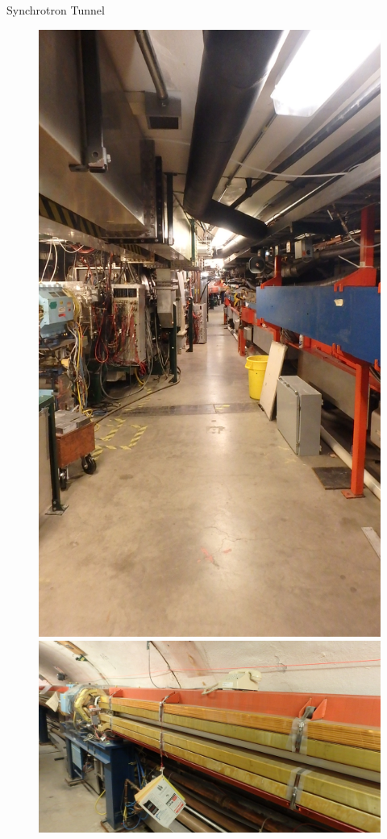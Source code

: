 \documentclass[10pt]{beamer}
\begin{document}
	\begin{frame}{Synchrotron Tunnel}



\begin{figure}
	\begin{minipage}{0.47\textwidth}
		\includegraphics[scale=0.1,angle=-90]{chess4.JPG}
	\end{minipage}
	\begin{minipage}{0.5\textwidth}
		\includegraphics[scale=0.09]{chess5.JPG}

\end{minipage}
\end{figure}
\end{frame}
\end{document}

